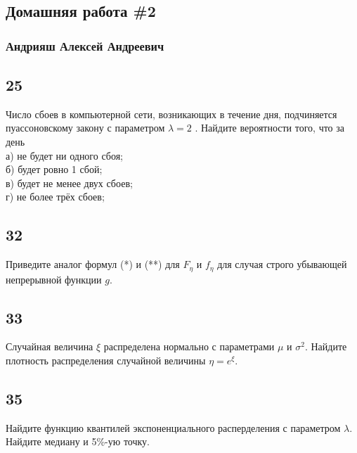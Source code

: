 \documentclass[a4paper, 12pt]{extarticle}
\numberwithin{figure}{section}
\begin{document}
\subsection*{Домашняя работа \#2}

\subsubsection*{Андрияш Алексей Андреевич}

\subsection*{25}
Число сбоев в компьютерной сети, возникающих в течение дня, подчиняется
пуассоновскому закону с параметром $\lambda = 2$ . Найдите вероятности того, что за день\\
а) не будет ни одного сбоя;\\
б) будет ровно 1 сбой;\\
в) будет не менее двух сбоев;\\
г) не более трёх сбоев;\\

\subsection*{32}
Приведите аналог формул (*) и (**) для $F_\eta$ и $f_\eta$ для случая строго убывающей непрерывной функции $g$.\\

\subsection*{33}
Случайная величина $\xi$ распределена нормально с параметрами $\mu$ и $\sigma^2$. Найдите плотность распределения случайной величины $\eta = e^\xi$.\\

\subsection*{35}
Найдите функцию квантилей экспоненциального расперделения с параметром $\lambda$.\\
Найдите медиану и 5\%-ую точку.\\
\end{document}
